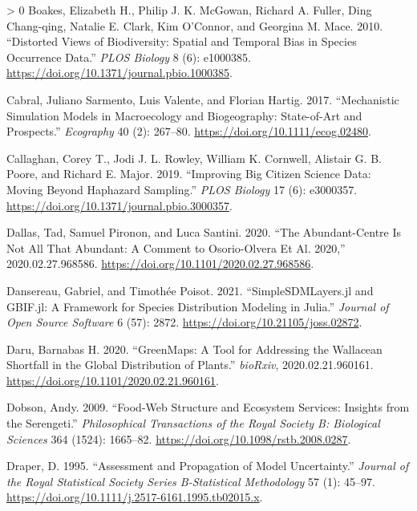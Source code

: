 \documentclass[10pt,oneside]{article}
\newlength{\cslhangindent}
\newenvironment{CSLReferences}[3] %
 {%
  \setlength{\parindent}{0pt}
  \ifodd #1 \everypar{\setlength{\hangindent}{\cslhangindent}}\ignorespaces\fi
  \ifnum #2 > 0
  \setlength{\parskip}{#2\baselineskip}
  \fi
 }%
 {}
\begin{document}
\begin{CSLReferences}{1}{0}
\leavevmode\hypertarget{ref-Boakes2010DisVie}{}%
Boakes, Elizabeth H., Philip J. K. McGowan, Richard A. Fuller, Ding
Chang-qing, Natalie E. Clark, Kim O'Connor, and Georgina M. Mace. 2010.
{``Distorted Views of Biodiversity: Spatial and Temporal Bias in Species
Occurrence Data.''} \emph{PLOS Biology} 8 (6): e1000385.
\url{https://doi.org/10.1371/journal.pbio.1000385}.

\leavevmode\hypertarget{ref-Cabral2017MecSim}{}%
Cabral, Juliano Sarmento, Luis Valente, and Florian Hartig. 2017.
{``Mechanistic Simulation Models in Macroecology and Biogeography:
State-of-Art and Prospects.''} \emph{Ecography} 40 (2): 267--80.
\url{https://doi.org/10.1111/ecog.02480}.

\leavevmode\hypertarget{ref-Callaghan2019ImpBig}{}%
Callaghan, Corey T., Jodi J. L. Rowley, William K. Cornwell, Alistair G.
B. Poore, and Richard E. Major. 2019. {``Improving Big Citizen Science
Data: Moving Beyond Haphazard Sampling.''} \emph{PLOS Biology} 17 (6):
e3000357. \url{https://doi.org/10.1371/journal.pbio.3000357}.

\leavevmode\hypertarget{ref-Dallas2020AbuNot}{}%
Dallas, Tad, Samuel Pironon, and Luca Santini. 2020. {``The
Abundant-Centre Is Not All That Abundant: A Comment to Osorio-Olvera Et
Al. 2020,''} 2020.02.27.968586.
\url{https://doi.org/10.1101/2020.02.27.968586}.

\leavevmode\hypertarget{ref-Dansereau2021SimJl}{}%
Dansereau, Gabriel, and Timothée Poisot. 2021. {``SimpleSDMLayers.jl and
GBIF.jl: A Framework for Species Distribution Modeling in Julia.''}
\emph{Journal of Open Source Software} 6 (57): 2872.
\url{https://doi.org/10.21105/joss.02872}.

\leavevmode\hypertarget{ref-Daru2020GreToo}{}%
Daru, Barnabas H. 2020. {``GreenMaps: A Tool for Addressing the
Wallacean Shortfall in the Global Distribution of Plants.''}
\emph{bioRxiv}, 2020.02.21.960161.
\url{https://doi.org/10.1101/2020.02.21.960161}.

\leavevmode\hypertarget{ref-Dobson2009FooStr}{}%
Dobson, Andy. 2009. {``Food-Web Structure and Ecosystem Services:
Insights from the Serengeti.''} \emph{Philosophical Transactions of the
Royal Society B: Biological Sciences} 364 (1524): 1665--82.
\url{https://doi.org/10.1098/rstb.2008.0287}.

\leavevmode\hypertarget{ref-Draper1995AssPro}{}%
Draper, D. 1995. {``Assessment and Propagation of Model Uncertainty.''}
\emph{Journal of the Royal Statistical Society Series B-Statistical
Methodology} 57 (1): 45--97.
\url{https://doi.org/10.1111/j.2517-6161.1995.tb02015.x}.


\end{CSLReferences}
\end{document}
